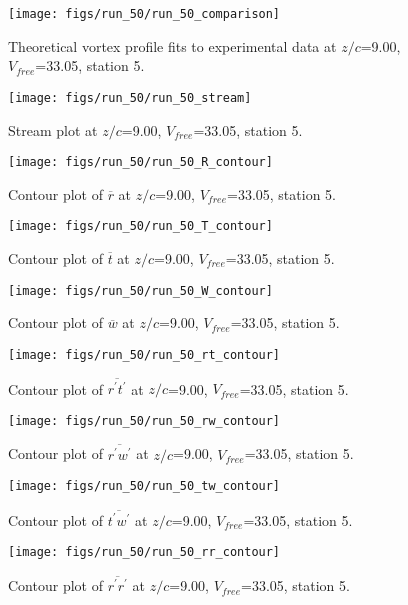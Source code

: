 \begin{figure}[H]
\centering
\texttt{[image: figs/run\_50/run\_50\_comparison]}
\caption{Theoretical vortex profile fits to experimental data at $z/c$=9.00, $V_{free}$=33.05, station 5.}
\end{figure}


\begin{figure}[H]
\centering
\texttt{[image: figs/run\_50/run\_50\_stream]}
\caption{Stream plot at $z/c$=9.00, $V_{free}$=33.05, station 5.}
\end{figure}


\begin{figure}[H]
\centering
\texttt{[image: figs/run\_50/run\_50\_R\_contour]}
\caption{Contour plot of $\overline{r}$ at $z/c$=9.00, $V_{free}$=33.05, station 5.}
\end{figure}


\begin{figure}[H]
\centering
\texttt{[image: figs/run\_50/run\_50\_T\_contour]}
\caption{Contour plot of $\overline{t}$ at $z/c$=9.00, $V_{free}$=33.05, station 5.}
\end{figure}


\begin{figure}[H]
\centering
\texttt{[image: figs/run\_50/run\_50\_W\_contour]}
\caption{Contour plot of $\overline{w}$ at $z/c$=9.00, $V_{free}$=33.05, station 5.}
\end{figure}


\begin{figure}[H]
\centering
\texttt{[image: figs/run\_50/run\_50\_rt\_contour]}
\caption{Contour plot of $\overline{r^\prime t^\prime}$ at $z/c$=9.00, $V_{free}$=33.05, station 5.}
\end{figure}


\begin{figure}[H]
\centering
\texttt{[image: figs/run\_50/run\_50\_rw\_contour]}
\caption{Contour plot of $\overline{r^\prime w^\prime}$ at $z/c$=9.00, $V_{free}$=33.05, station 5.}
\end{figure}


\begin{figure}[H]
\centering
\texttt{[image: figs/run\_50/run\_50\_tw\_contour]}
\caption{Contour plot of $\overline{t^\prime w^\prime}$ at $z/c$=9.00, $V_{free}$=33.05, station 5.}
\end{figure}


\begin{figure}[H]
\centering
\texttt{[image: figs/run\_50/run\_50\_rr\_contour]}
\caption{Contour plot of $\overline{r^\prime r^\prime}$ at $z/c$=9.00, $V_{free}$=33.05, station 5.}
\end{figure}


